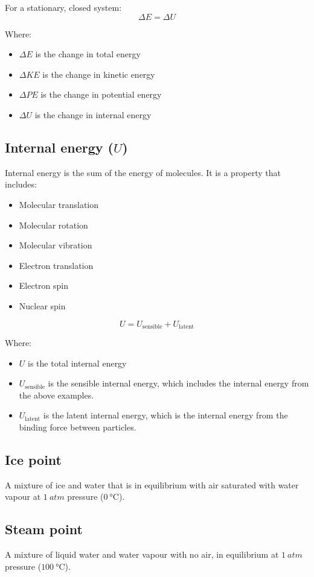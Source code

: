 \documentclass[11pt]{article}
\begin{document}
For a stationary, closed system:
\[\Delta E = \Delta U\]

Where:
\begin{itemize}
\item \(\Delta E\) is the change in total energy
\item \(\Delta KE\) is the change in kinetic energy
\item \(\Delta PE\) is the change in potential energy
\item \(\Delta U\) is the change in internal energy
\end{itemize}

\subsection{Internal energy (\(U\))}
\label{sec:orgbdf5c5a}
Internal energy is the sum of the energy of molecules. It is a property that includes:
\begin{itemize}
\item Molecular translation
\item Molecular rotation
\item Molecular vibration
\item Electron translation
\item Electron spin
\item Nuclear spin
\end{itemize}

\[U = U_{\text{sensible}} + U_{\text{latent}}\]

Where:
\begin{itemize}
\item \(U\) is the total internal energy
\item \(U_{\text{sensible}}\) is the sensible internal energy, which includes the internal energy from the above examples.
\item \(U_{\text{latent}}\) is the latent internal energy, which is the internal energy from the binding force between particles.
\end{itemize}

\subsection{Ice point}
\label{sec:org562b5e9}
A mixture of ice and water that is in equilibrium with air saturated with water vapour at \(\qty{1}{atm}\) pressure (\(\qty{0}{\degreeCelsius}\)).

\subsection{Steam point}
\label{sec:org7cadaf1}
A mixture of liquid water and water vapour with no air, in equilibrium at \(\qty{1}{atm}\) pressure (\(\qty{100}{\degreeCelsius}\)).
\end{document}
